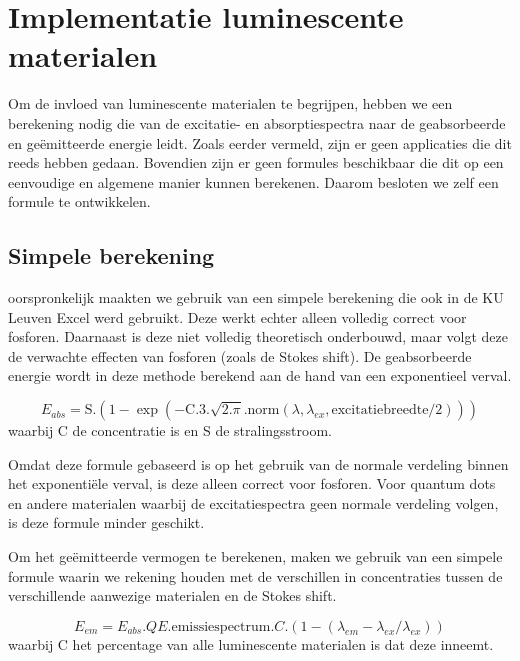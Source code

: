 \section{Implementatie luminescente materialen}

Om de invloed van luminescente materialen te begrijpen, hebben we een berekening nodig die van de excitatie- en absorptiespectra naar de geabsorbeerde en ge\"emitteerde energie leidt. Zoals eerder vermeld, zijn er geen applicaties die dit reeds hebben gedaan. Bovendien zijn er geen formules beschikbaar die dit op een eenvoudige en algemene manier kunnen berekenen. Daarom besloten we zelf een formule te ontwikkelen.

\subsection{Simpele berekening}

oorspronkelijk maakten we gebruik van een simpele berekening die ook in de KU Leuven Excel werd gebruikt. Deze werkt echter alleen volledig correct voor fosforen. Daarnaast is deze niet volledig theoretisch onderbouwd, maar volgt deze de verwachte effecten van fosforen (zoals de Stokes shift). De geabsorbeerde energie wordt in deze methode berekend aan de hand van een exponentieel verval.

\begin{equation} E_{abs} = \text{S} . (1 - \exp(-\text{C}.3.\sqrt{2.\pi}.\text{norm}(\lambda,\lambda_{ex},\text{excitatiebreedte/2}) )) \end{equation} waarbij C de concentratie is en S de stralingsstroom.\

Omdat deze formule gebaseerd is op het gebruik van de normale verdeling binnen het exponenti\"ele verval, is deze alleen correct voor fosforen. Voor quantum dots en andere materialen waarbij de excitatiespectra geen normale verdeling volgen, is deze formule minder geschikt.

Om het ge\"emitteerde vermogen te berekenen, maken we gebruik van een simpele formule waarin we rekening houden met de verschillen in concentraties tussen de verschillende aanwezige materialen en de Stokes shift.

\begin{equation} E_{em} = E_{abs} . QE . \text{emissiespectrum} . C . (1 - (\lambda_{em}-\lambda_{ex}/\lambda_{ex})) \end{equation} waarbij C het percentage van alle luminescente materialen is dat deze inneemt.

